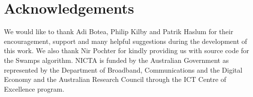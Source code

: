 \section{Acknowledgements}
We would like to thank Adi Botea, Philip Kilby and Patrik Haslum for their 
encouragement, support and many helpful suggestions during the development 
of this work.
We also thank Nir Pochter for kindly providing us with source code for the
Swamps algorithm.
NICTA is funded by the Australian Government as represented by the Department of 
Broadband, Communications and the Digital Economy and the Australian Research 
Council through the ICT Centre of Excellence program.
